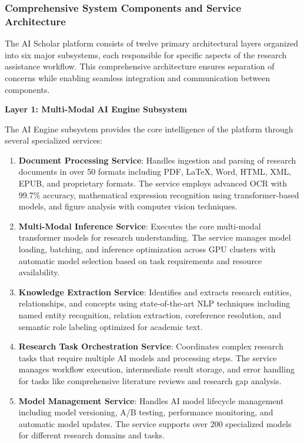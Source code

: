 \documentclass[10pt,twocolumn]{article}
\begin{document}
\subsubsection{Comprehensive System Components and Service Architecture}

The AI Scholar platform consists of twelve primary architectural layers organized into six major subsystems, each responsible for specific aspects of the research assistance workflow. This comprehensive architecture ensures separation of concerns while enabling seamless integration and communication between components.

\textbf{Layer 1: Multi-Modal AI Engine Subsystem}

The AI Engine subsystem provides the core intelligence of the platform through several specialized services:

\begin{enumerate}
    \item \textbf{Document Processing Service}: Handles ingestion and parsing of research documents in over 50 formats including PDF, LaTeX, Word, HTML, XML, EPUB, and proprietary formats. The service employs advanced OCR with 99.7\% accuracy, mathematical expression recognition using transformer-based models, and figure analysis with computer vision techniques.
    
    \item \textbf{Multi-Modal Inference Service}: Executes the core multi-modal transformer models for research understanding. The service manages model loading, batching, and inference optimization across GPU clusters with automatic model selection based on task requirements and resource availability.
    
    \item \textbf{Knowledge Extraction Service}: Identifies and extracts research entities, relationships, and concepts using state-of-the-art NLP techniques including named entity recognition, relation extraction, coreference resolution, and semantic role labeling optimized for academic text.
    
    \item \textbf{Research Task Orchestration Service}: Coordinates complex research tasks that require multiple AI models and processing steps. The service manages workflow execution, intermediate result storage, and error handling for tasks like comprehensive literature reviews and research gap analysis.
    
    \item \textbf{Model Management Service}: Handles AI model lifecycle management including model versioning, A/B testing, performance monitoring, and automatic model updates. The service supports over 200 specialized models for different research domains and tasks.
\end{enumerate}
\end{document}
